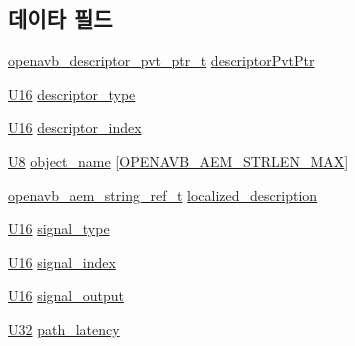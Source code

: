 \subsection*{데이타 필드}
\begin{DoxyCompactItemize}
\item 
\hyperlink{openavb__aem__pub_8h_a85eabab4b7d2466e94c1c3b43b11371d}{openavb\+\_\+descriptor\+\_\+pvt\+\_\+ptr\+\_\+t} \hyperlink{structopenavb__aem__descriptor__audio__cluster__t_a302e92fd6cf4d398d5305395359fb157}{descriptor\+Pvt\+Ptr}
\item 
\hyperlink{openavb__types__base__pub_8h_a0a0a322d5fa4a546d293a77ba8b4a71f}{U16} \hyperlink{structopenavb__aem__descriptor__audio__cluster__t_a1e231d7874aada5925b29affc76782cc}{descriptor\+\_\+type}
\item 
\hyperlink{openavb__types__base__pub_8h_a0a0a322d5fa4a546d293a77ba8b4a71f}{U16} \hyperlink{structopenavb__aem__descriptor__audio__cluster__t_ab26fb363c24b9a2a4391f9171c981b08}{descriptor\+\_\+index}
\item 
\hyperlink{openavb__types__base__pub_8h_aa63ef7b996d5487ce35a5a66601f3e73}{U8} \hyperlink{structopenavb__aem__descriptor__audio__cluster__t_a5e98aba8105a7a6d82fac41816c83da3}{object\+\_\+name} \mbox{[}\hyperlink{openavb__aem__types__pub_8h_ab2bb82e9f856a76b8305e4864f23ee58}{O\+P\+E\+N\+A\+V\+B\+\_\+\+A\+E\+M\+\_\+\+S\+T\+R\+L\+E\+N\+\_\+\+M\+AX}\mbox{]}
\item 
\hyperlink{structopenavb__aem__string__ref__t}{openavb\+\_\+aem\+\_\+string\+\_\+ref\+\_\+t} \hyperlink{structopenavb__aem__descriptor__audio__cluster__t_afd613361c59409fb6dcc0c237d1cfbfd}{localized\+\_\+description}
\item 
\hyperlink{openavb__types__base__pub_8h_a0a0a322d5fa4a546d293a77ba8b4a71f}{U16} \hyperlink{structopenavb__aem__descriptor__audio__cluster__t_a51ba5fdff9933eb274b46b67185d1c7b}{signal\+\_\+type}
\item 
\hyperlink{openavb__types__base__pub_8h_a0a0a322d5fa4a546d293a77ba8b4a71f}{U16} \hyperlink{structopenavb__aem__descriptor__audio__cluster__t_ad948e7e79bb182b81a76a51c3d6ee9ed}{signal\+\_\+index}
\item 
\hyperlink{openavb__types__base__pub_8h_a0a0a322d5fa4a546d293a77ba8b4a71f}{U16} \hyperlink{structopenavb__aem__descriptor__audio__cluster__t_a6a464d21574d97691ea70c2037ff8f6f}{signal\+\_\+output}
\item 
\hyperlink{openavb__types__base__pub_8h_a696390429f2f3b644bde8d0322a24124}{U32} \hyperlink{structopenavb__aem__descriptor__audio__cluster__t_a753d29a0ce90fd89d0f7ed55e2ec717d}{path\+\_\+latency}

\end{DoxyCompactItemize}
